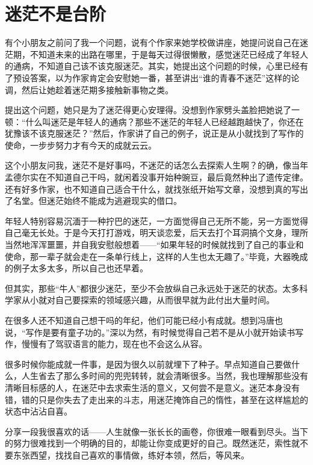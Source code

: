 
\section*{迷茫不是台阶}

有个小朋友之前问了我一个问题，说有个作家来她学校做讲座，她提问说自己在迷茫期，不知道未来的出路在哪里，于是每天过得很懒散，感觉迷茫已经成了年轻人的通病，不知道自己该不该克服迷茫。其实，她提出这个问题的时候，心里已经有了预设答案，以为作家肯定会安慰她一番，甚至讲出“谁的青春不迷茫”这样的论调，然后让她趁着迷茫期多接触新事物之类。

提出这个问题，她只是为了迷茫得更心安理得。没想到作家劈头盖脸把她说了一顿：“什么叫迷茫是年轻人的通病？那些不迷茫的年轻人已经越跑越快了，你还在犹豫该不该克服迷茫？”然后，作家讲了自己的例子，说正是从小就找到了写作的使命，一步步努力才有今天的成就云云。

这个小朋友问我，迷茫不是好事吗，不迷茫的话怎么去探索人生啊？的确，像当年孟德尔实在不知道自己干吗，就闲着没事开始种豌豆，最后竟然种出了遗传定律。还有好多作家，也不知道自己适合干什么，就找张纸开始写文章，没想到真的写出了名堂。但迷茫始终不能成为逃避现实的借口。

年轻人特别容易沉湎于一种拧巴的迷茫，一方面觉得自己无所不能，另一方面觉得自己毫无长处。于是今天打打游戏，明天谈恋爱，后天去打个耳洞搞个文身，理所当然地浑浑噩噩，并自我安慰般想着——“如果年轻的时候就找到了自己的事业和使命，那一辈子就会走在一条单行线上，这样的人生也太无趣了。”毕竟，大器晚成的例子太多太多，所以自己也还早着。

但其实，那些“牛人”都很少迷茫，至少不会放纵自己永远处于迷茫的状态。太多科学家从小就对自己要探索的领域感兴趣，从而很早就为此付出大量时间。

在很多人还不知道自己想干吗的年纪，他们可能已经小有成就。想到冯唐也说，“写作是要有童子功的。”深以为然，有时候觉得自己若不是从小就开始读书写作，慢慢有了驾驭语言的能力，现在也不会这么从容。

很多时候你能成就一件事，是因为很久以前就埋下了种子。早点知道自己要做什么，人生省去了那么多时间的兜兜转转，就会清晰很多。当然，我也理解那些没有清晰目标感的人，在迷茫中去求索生活的意义，又何尝不是意义。迷茫本身没有错，错的只是你失去了走出来的斗志，用迷茫掩饰自己的惰性，甚至在这样尴尬的状态中沾沾自喜。

分享一段我很喜欢的话——人生就像一张长长的画卷，你很难一眼看到尽头。当下的努力很难找到一个明确的目的，却能让你变成更好的自己。既然迷茫，索性就不要东张西望，找找自己喜欢的事情做，练好本领，然后，等风来。

